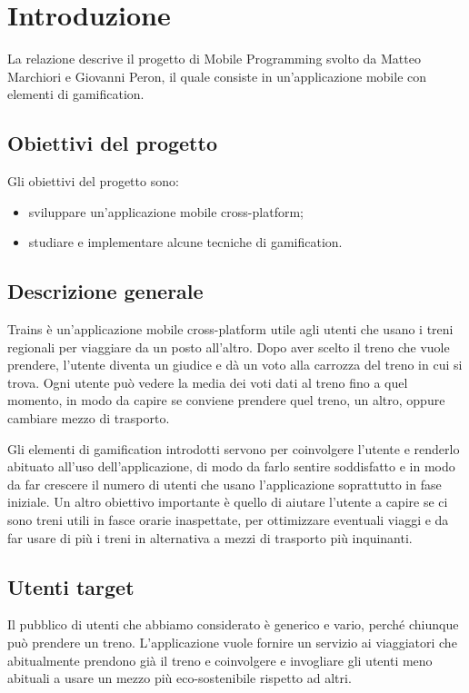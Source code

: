 \chapter{Introduzione\label{sec:introduzione}}
\noindent La relazione descrive il progetto di Mobile Programming svolto da Matteo Marchiori e Giovanni Peron, il quale consiste in un'applicazione mobile con elementi di gamification.

\section{Obiettivi del progetto\label{sec:obiettivi}}
Gli obiettivi del progetto sono:
\begin{itemize}
    \item sviluppare un'applicazione mobile cross-platform;
    \item studiare e implementare alcune tecniche di gamification.
\end{itemize}

\section{Descrizione generale\label{sec:descrizione}}
Trains è un'applicazione mobile cross-platform utile agli utenti che usano i treni regionali per viaggiare da un posto all'altro. Dopo aver scelto il treno che vuole prendere, l'utente diventa un giudice e dà un voto alla carrozza del treno in cui si trova. Ogni utente può vedere la media dei voti dati al treno fino a quel momento, in modo da capire se conviene prendere quel treno, un altro, oppure cambiare mezzo di trasporto.

Gli elementi di gamification introdotti servono per coinvolgere l'utente e renderlo abituato all'uso dell'applicazione, di modo da farlo sentire soddisfatto e in modo da far crescere il numero di utenti che usano l'applicazione soprattutto in fase iniziale.
Un altro obiettivo importante è quello di aiutare l'utente a capire se ci sono treni utili in fasce orarie inaspettate, per ottimizzare eventuali viaggi e da far usare di più i treni in alternativa a mezzi di trasporto più inquinanti.

\section{Utenti target}
Il pubblico di utenti che abbiamo considerato è generico e vario, perché chiunque può prendere un treno.
L'applicazione vuole fornire un servizio ai viaggiatori che abitualmente prendono già il treno e coinvolgere e invogliare gli utenti meno abituali a usare un mezzo più eco-sostenibile rispetto ad altri.